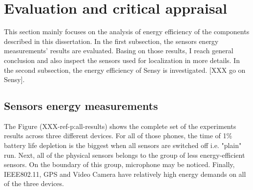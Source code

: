 \section{Evaluation and critical appraisal}
\label{s:evaluation}

This section mainly focuses on the analysis of energy efficiency of the components described in this dissertation. In the first subsection, the sensors energy measurements' results are evaluated. Basing on those results, I reach general conclusion and also inspect the sensors used for localization in more details.  In the second subsection, the energy efficiency of Sensy is investigated. [XXX go on Sensy].

\subsection{Sensors energy measurements}

The Figure (XXX-ref-p:all-results) shows the complete set of the experiments results across three different devices. For all of those phones, the time of 1\% battery life depletion is the biggest when all sensors are switched off i.e. "plain" run. Next, all of the physical sensors belongs to the group of less energy-efficient sensors. On the boundary of this group, microphone may be noticed. Finally, IEEE802.11, GPS and Video Camera have relatively high energy demands on all of the three devices.

